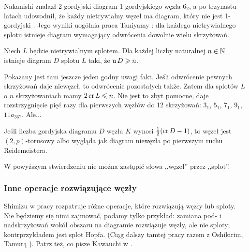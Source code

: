 Nakanishi \cite{nakanishi1983} znalazł 2-gordyjski diagram 1-gordyjskiego węzła $6_2$, a po trzynastu latach udowodnił, że każdy nietrywialny węzeł ma diagram, który nie jest 1-gordyjski \cite{nakanishi1996}.
%
Jego wyniki uogólnia praca Taniyamy \cite{taniyama2009}: dla każdego nietrywialnego splotu istnieje diagram wymagający odwrócenia dowolnie wielu skrzyżowań.
%

\begin{proposition}
    Niech $L$ będzie nietrywialnym splotem.
    Dla każdej liczby naturalnej $n \in \mathbb N$ istnieje diagram $D$ splotu $L$ taki, że $\operatorname{u} D \geqslant n$.
\end{proposition}

Pokazany jest tam jeszcze jeden godny uwagi fakt.
Jeśli odwrócenie pewnych skrzyżowań daje niewęzeł, to odwrócenie pozostałych także.
Zatem dla splotów $L$ o $n$ skrzyżowaniach mamy $2 \operatorname{cr} L \leqslant n$.
Nie jest to zbyt pomocne, daje rozstrzygnięcie pięć razy dla pierwszych węzłów do 12 skrzyżowań: $3_{1}$, $5_{1}$, $7_{1}$, $9_{1}$, $11a_{367}$.
Ale...

\begin{proposition}
    Jeśli liczba gordyjska diagramu $D$ węzła $K$ wynosi $\frac 12 (\operatorname{cr} D - 1)$, to węzeł jest $(2,p)$-torusowy albo wygląda jak diagram niewęzła po pierwszym ruchu Reidemeistera.
\end{proposition}

W powyższym stwierdzeniu nie można zastąpić słowa ,,węzeł'' przez ,,splot''.











\subsubsection{Inne operacje rozwiązujące węzły}

Shimizu w pracy \cite{shimizu2014} rozpatruje różne operacje, które rozwiązują węzły lub sploty.
%
Nie będziemy się nimi zajmować, podamy tylko przykład: zamiana pod- i nadskrzyżowań wokół obszaru na diagramie rozwiązuje węzły, ale nie sploty; kontrprzykładem jest splot Hopfa.
%
(Ciąg dalszy tamtej pracy razem z Oshikirim, Tamurą \cite{oshikiri2024}).
%
%
Patrz też, co pisze Kawauchi w \cite[s. 141-154]{kawauchi1996}.


